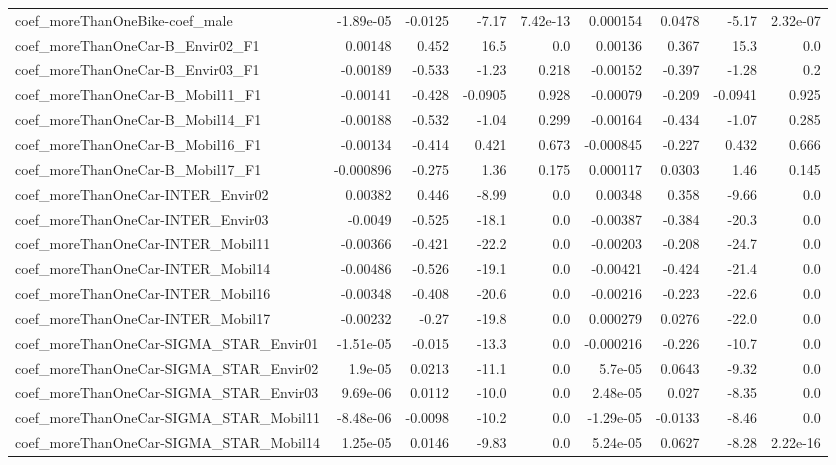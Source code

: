 \begin{tabular}{lrrrrrrrr}
coef_moreThanOneBike-coef_male & -1.89e-05 & -0.0125 & -7.17 & 7.42e-13 & 0.000154 & 0.0478 & -5.17 & 2.32e-07 \\
coef_moreThanOneCar-B_Envir02_F1 & 0.00148 & 0.452 & 16.5 & 0.0 & 0.00136 & 0.367 & 15.3 & 0.0 \\
coef_moreThanOneCar-B_Envir03_F1 & -0.00189 & -0.533 & -1.23 & 0.218 & -0.00152 & -0.397 & -1.28 & 0.2 \\
coef_moreThanOneCar-B_Mobil11_F1 & -0.00141 & -0.428 & -0.0905 & 0.928 & -0.00079 & -0.209 & -0.0941 & 0.925 \\
coef_moreThanOneCar-B_Mobil14_F1 & -0.00188 & -0.532 & -1.04 & 0.299 & -0.00164 & -0.434 & -1.07 & 0.285 \\
coef_moreThanOneCar-B_Mobil16_F1 & -0.00134 & -0.414 & 0.421 & 0.673 & -0.000845 & -0.227 & 0.432 & 0.666 \\
coef_moreThanOneCar-B_Mobil17_F1 & -0.000896 & -0.275 & 1.36 & 0.175 & 0.000117 & 0.0303 & 1.46 & 0.145 \\
coef_moreThanOneCar-INTER_Envir02 & 0.00382 & 0.446 & -8.99 & 0.0 & 0.00348 & 0.358 & -9.66 & 0.0 \\
coef_moreThanOneCar-INTER_Envir03 & -0.0049 & -0.525 & -18.1 & 0.0 & -0.00387 & -0.384 & -20.3 & 0.0 \\
coef_moreThanOneCar-INTER_Mobil11 & -0.00366 & -0.421 & -22.2 & 0.0 & -0.00203 & -0.208 & -24.7 & 0.0 \\
coef_moreThanOneCar-INTER_Mobil14 & -0.00486 & -0.526 & -19.1 & 0.0 & -0.00421 & -0.424 & -21.4 & 0.0 \\
coef_moreThanOneCar-INTER_Mobil16 & -0.00348 & -0.408 & -20.6 & 0.0 & -0.00216 & -0.223 & -22.6 & 0.0 \\
coef_moreThanOneCar-INTER_Mobil17 & -0.00232 & -0.27 & -19.8 & 0.0 & 0.000279 & 0.0276 & -22.0 & 0.0 \\
coef_moreThanOneCar-SIGMA_STAR_Envir01 & -1.51e-05 & -0.015 & -13.3 & 0.0 & -0.000216 & -0.226 & -10.7 & 0.0 \\
coef_moreThanOneCar-SIGMA_STAR_Envir02 & 1.9e-05 & 0.0213 & -11.1 & 0.0 & 5.7e-05 & 0.0643 & -9.32 & 0.0 \\
coef_moreThanOneCar-SIGMA_STAR_Envir03 & 9.69e-06 & 0.0112 & -10.0 & 0.0 & 2.48e-05 & 0.027 & -8.35 & 0.0 \\
coef_moreThanOneCar-SIGMA_STAR_Mobil11 & -8.48e-06 & -0.0098 & -10.2 & 0.0 & -1.29e-05 & -0.0133 & -8.46 & 0.0 \\
coef_moreThanOneCar-SIGMA_STAR_Mobil14 & 1.25e-05 & 0.0146 & -9.83 & 0.0 & 5.24e-05 & 0.0627 & -8.28 & 2.22e-16 \\

\end{tabular}
